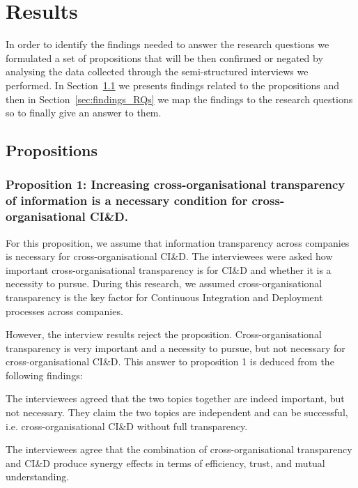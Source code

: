 \section{Results}\label{sec:results}

In order to identify the findings needed to answer the research questions we formulated a set of propositions that will be then confirmed or negated by analysing the data collected through the semi-structured interviews we performed. In Section~\ref{sec:propositions} we presents findings related to the propositions and then in Section~\ref{sec:findings_RQs} we map the findings to the research questions so to finally give an answer to them.

\subsection{Propositions}\label{sec:propositions}

\subsubsection{Proposition 1: Increasing cross-organisational transparency of information is a necessary condition for cross-organisational CI\&D.}

For this proposition, we assume that information transparency across companies is necessary for cross-organisational CI\&D. The interviewees were asked how important cross-organisational transparency is for CI\&D and whether it is a necessity to pursue. During this research, we assumed cross-organisational transparency is the key factor for Continuous Integration and Deployment processes across companies. 

However, the interview results reject the proposition. Cross-organisational transparency is very important and a necessity to pursue, but not necessary for cross-organisational CI\&D. This answer to proposition 1 is deduced from the following findings:

 The interviewees agreed that the two topics together are indeed important, but not necessary. They claim the two topics are independent and can be successful, i.e. cross-organisational CI\&D without full transparency.

 The interviewees agree that the combination of cross-organisational transparency and CI\&D produce synergy effects in terms of efficiency, trust, and mutual understanding.

